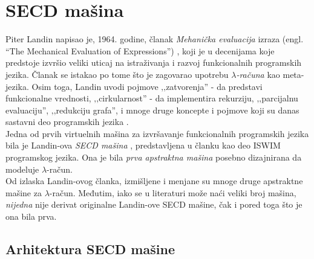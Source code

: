 \section{SECD mašina}
\label{sec:secd-masina}

%

Piter Landin napisao je, 1964. godine, članak {\em Mehanička evaluacija} izraza (engl. “The Mechanical Evaluation of Expressions”) \cite{landinsecd}, koji je u decenijama koje predstoje izvršio veliki uticaj na istraživanja i razvoj funkcionalnih programskih jezika. Članak se istakao po tome što je zagovarao upotrebu {\em $\lambda$-računa} kao meta-jezika. Osim toga, Landin uvodi pojmove ‚‚zatvorenja'' - da predstavi funkcionalne vrednosti, ‚‚cirkularnost'' - da implementira rekurziju, ‚‚parcijalnu evaluaciju'', ‚‚redukciju grafa'', i mnoge druge koncepte i pojmove koji su danas sastavni deo programskih jezika \cite{calls-lambda, compiler-design}.\\

Jedna od prvih virtuelnih mašina za izvršavanje funkcionalnih programskih jezika bila je Landin-ova {\em SECD mašina} \cite{landin-secd}, predstavljena u članku kao deo ISWIM \cite{ISWIM} programskog jezika. Ona je bila {\em prva apstraktna mašina} posebno dizajnirana da modeluje $\lambda$-račun. \\

Od izlaska Landin-ovog članka, izmišljene i menjane su mnoge druge apstraktne mašine za $\lambda$-račun. Međutim, iako se u literaturi može naći veliki broj mašina, {\em nijedna} nije derivat originalne Landin-ove SECD mašine, čak i pored toga što je ona bila prva.


\subsection{Arhitektura SECD mašine}

